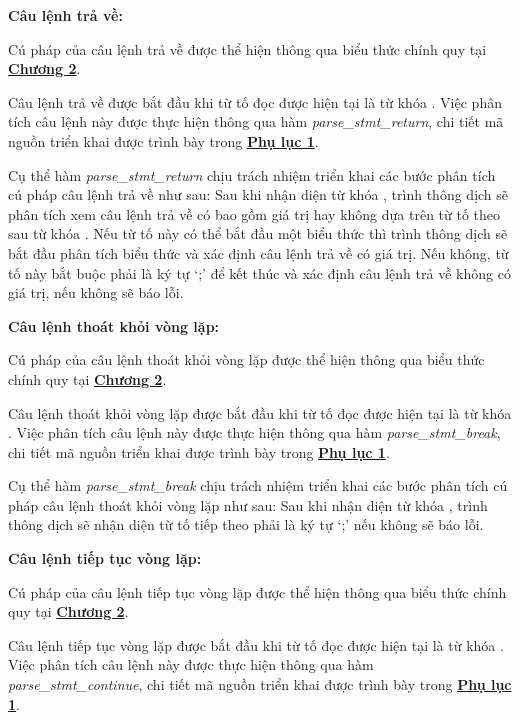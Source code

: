 \noindent\textbf{Câu lệnh trả về:}

Cú pháp của câu lệnh trả về được thể hiện thông qua biểu thức chính quy tại \hyperref[ch2:return_stmt]{\bf Chương 2}.

Câu lệnh trả về được bắt đầu khi từ tố đọc được hiện tại là từ khóa . Việc phân tích câu lệnh này được thực hiện thông qua hàm \textit{parse\_stmt\_return}, chi tiết mã nguồn triển khai được trình bày trong \hyperref[ap1:stmt_yeet]{\bf Phụ lục 1}. %

Cụ thể hàm \textit{parse\_stmt\_return} chịu trách nhiệm triển khai các bước phân tích cú pháp câu lệnh trả về như sau: 
Sau khi nhận diện từ khóa , trình thông dịch sẽ phân tích xem câu lệnh trả về có bao gồm giá trị hay không dựa trên từ tố theo sau từ khóa . Nếu từ tố này có thể bắt đầu một biểu thức thì trình thông dịch sẽ bắt đầu phân tích biểu thức và xác định câu lệnh trả về có giá trị. Nếu không, từ tố này bắt buộc phải là ký tự `;' để kết thúc và xác định câu lệnh trả về không có giá trị, nếu không sẽ báo lỗi.



\noindent\textbf{Câu lệnh thoát khỏi vòng lặp:}

Cú pháp của câu lệnh thoát khỏi vòng lặp được thể hiện thông qua biểu thức chính quy tại \hyperref[ch2:break_stmt]{\bf Chương 2}.

Câu lệnh thoát khỏi vòng lặp được bắt đầu khi từ tố đọc được hiện tại là từ khóa . Việc phân tích câu lệnh này được thực hiện thông qua hàm \textit{parse\_stmt\_break}, chi tiết mã nguồn triển khai được trình bày trong \hyperref[ap1:stmt_br]{\bf Phụ lục 1}. %

Cụ thể hàm \textit{parse\_stmt\_break} chịu trách nhiệm triển khai các bước phân tích cú pháp câu lệnh thoát khỏi vòng lặp như sau: Sau khi nhận diện từ khóa , trình thông dịch sẽ nhận diện từ tố tiếp theo phải là ký tự `;' nếu không sẽ báo lỗi.


\noindent\textbf{Câu lệnh tiếp tục vòng lặp:}

Cú pháp của câu lệnh tiếp tục vòng lặp được thể hiện thông qua biểu thức chính quy tại \hyperref[ch2:continue_stmt]{\bf Chương 2}.

Câu lệnh tiếp tục vòng lặp được bắt đầu khi từ tố đọc được hiện tại là từ khóa . Việc phân tích câu lệnh này được thực hiện thông qua hàm \textit{parse\_stmt\_continue}, chi tiết mã nguồn triển khai được trình bày trong \hyperref[ap1:stmt_skip]{\bf Phụ lục 1}. %

